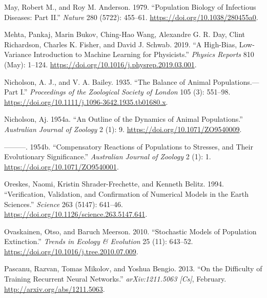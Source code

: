 \documentclass{article}
\newlength{\cslhangindent}
\newlength{\cslentryspacingunit} %
\newenvironment{CSLReferences}[2] %
 {%
  \setlength{\parindent}{0pt}
  \ifodd #1
  \let\oldpar\par
  \def\par{\hangindent=\cslhangindent\oldpar}
  \fi
  \setlength{\parskip}{#2\cslentryspacingunit}
 }%
 {}
\begin{document}
\begin{CSLReferences}{1}{0}
\leavevmode{}%
May, Robert M., and Roy M. Anderson. 1979. {``Population Biology of
Infectious Diseases: {Part} {II}.''} \emph{Nature} 280 (5722): 455--61.
\url{https://doi.org/10.1038/280455a0}.

\leavevmode{}%
Mehta, Pankaj, Marin Bukov, Ching-Hao Wang, Alexandre G. R. Day, Clint
Richardson, Charles K. Fisher, and David J. Schwab. 2019. {``A
High-Bias, Low-Variance Introduction to {Machine} {Learning} for
Physicists.''} \emph{Physics Reports} 810 (May): 1--124.
\url{https://doi.org/10.1016/j.physrep.2019.03.001}.

\leavevmode{}%
Nicholson, A. J., and V. A. Bailey. 1935. {``The {Balance} of {Animal}
{Populations}.---{Part} {I}.''} \emph{Proceedings of the Zoological
Society of London} 105 (3): 551--98.
\url{https://doi.org/10.1111/j.1096-3642.1935.tb01680.x}.

\leavevmode{}%
Nicholson, Aj. 1954a. {``An Outline of the Dynamics of Animal
Populations.''} \emph{Australian Journal of Zoology} 2 (1): 9.
\url{https://doi.org/10.1071/ZO9540009}.

\leavevmode{}%
---------. 1954b. {``Compensatory Reactions of Populations to Stresses,
and Their Evolutionary Significance.''} \emph{Australian Journal of
Zoology} 2 (1): 1. \url{https://doi.org/10.1071/ZO9540001}.

\leavevmode{}%
Oreskes, Naomi, Kristin Shrader-Frechette, and Kenneth Belitz. 1994.
{``Verification, {Validation}, and {Confirmation} of {Numerical}
{Models} in the {Earth} {Sciences}.''} \emph{Science} 263 (5147):
641--46. \url{https://doi.org/10.1126/science.263.5147.641}.

\leavevmode{}%
Ovaskainen, Otso, and Baruch Meerson. 2010. {``Stochastic Models of
Population Extinction.''} \emph{Trends in Ecology \& Evolution} 25 (11):
643--52. \url{https://doi.org/10.1016/j.tree.2010.07.009}.

\leavevmode{}%
Pascanu, Razvan, Tomas Mikolov, and Yoshua Bengio. 2013. {``On the
Difficulty of Training {Recurrent} {Neural} {Networks}.''}
\emph{arXiv:1211.5063 {[}Cs{]}}, February.
\url{http://arxiv.org/abs/1211.5063}.


\end{CSLReferences}
\end{document}
